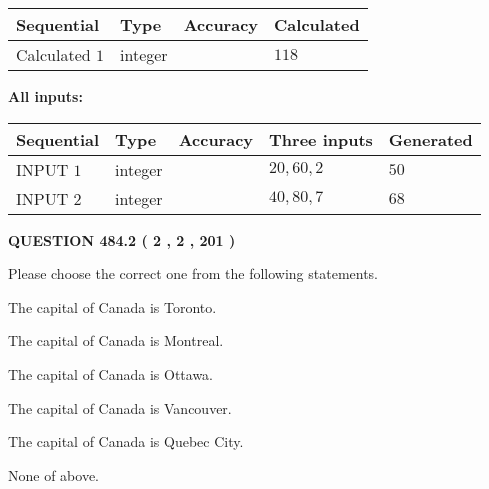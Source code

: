 \documentclass[12pt]{article}
\begin{document}
   
   
   
\noindent{}
   
   
  
  
\noindent\begin{tabular}{|l|l|l|l|}
\hline
 Sequential & Type & Accuracy & Calculated \\ 
\hline
 
 
  Calculated $  1 $ & integer &  & 
  $ 118 $ 
 \\  \hline  
 \end{tabular}
   
   
   
   
\noindent\vspace{0.1in}\hspace{-0.08in} {\textbf{\Large{All inputs: }}}
   
   
  
  
\noindent\begin{tabular}{|l|l|l|l|l|}
\hline
 Sequential & Type & Accuracy & Three inputs & Generated \\ 
\hline
 
 
  INPUT $  1 $ & integer &  & $
 20
 , 
 60
 , 
 2
 $ & $ 50 $ 
 \\  \hline  
 
 
  INPUT $  2 $ & integer &  & $
 40
 , 
 80
 , 
 7
 $ & $ 68 $ 
 \\  \hline  
 \end{tabular}
   
   
  
\vspace{0.2in}
  
{\textbf{\Large{QUESTION
484.2 
 ( 2 , 2 , 201 )
}}}
  
  
Please choose the correct one from the following statements.
 
 
The capital of Canada is Toronto.
 
 
The capital of Canada is Montreal.
 
 
The capital of Canada is Ottawa.
 
 
The capital of Canada is Vancouver.
 
 
The capital of Canada is Quebec City.
 
 
 None of above.
 
 
\noindent{}
 
\end{document}
